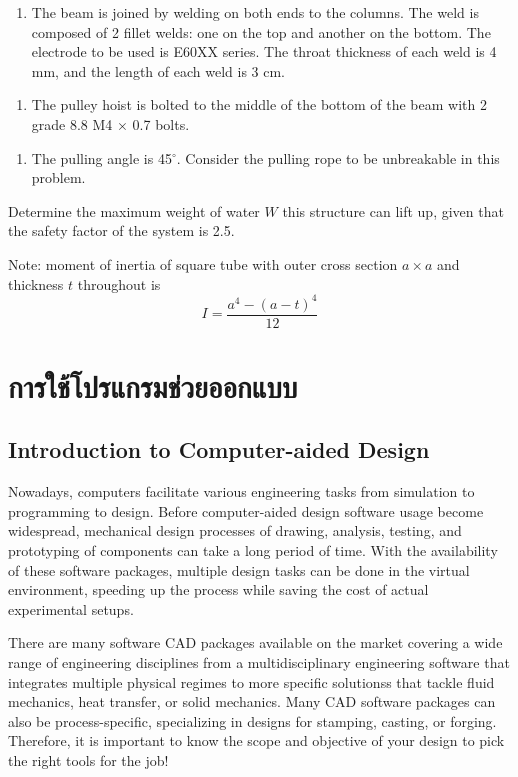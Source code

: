 \documentclass[a4paper,openany,12pt]{book}
\begin{document}
{{\hspace{1cm}
\begin{enumerate}
\item The beam is joined by welding on both ends to the columns. The weld
is composed of 2 fillet welds: one on the top and another on the
bottom. The electrode to be used is E60XX series. The throat
thickness of each weld is 4 mm, and the length of each weld is 3 cm.
\end{enumerate}


\begin{enumerate}
\item The pulley hoist is bolted to the middle of the bottom of the beam
with 2 grade 8.8 M4 \(\times\) 0.7 bolts.
\end{enumerate}


\begin{enumerate}
\item The pulling angle is 45\(^{\circ}\). Consider the pulling rope to be
unbreakable in this problem.
\end{enumerate}

Determine the maximum weight of water \(W\) this structure can lift up,
given that the safety factor of the system is 2.5.

Note: moment of inertia of square tube with outer cross section
\(a \times a\) and thickness \(t\) throughout is
$$I = \frac{a^4 - (a-t)^4}{12}$$

\part{การใช้โปรแกรมช่วยออกแบบ}
\label{sec:orgdc09abb}
\chapter{Introduction to Computer-aided Design}
\label{sec:orgafad926}
Nowadays, computers facilitate various engineering tasks from simulation
to programming to design. Before computer-aided design software usage
become widespread, mechanical design processes of drawing, analysis,
testing, and prototyping of components can take a long period of time.
With the availability of these software packages, multiple design tasks
can be done in the virtual environment, speeding up the process while
saving the cost of actual experimental setups.

There are many software CAD packages available on the market covering a
wide range of engineering disciplines from a multidisciplinary
engineering software that integrates multiple physical regimes to more
specific solutionss that tackle fluid mechanics, heat transfer, or solid
mechanics. Many CAD software packages can also be process-specific,
specializing in designs for stamping, casting, or forging. Therefore, it
is important to know the scope and objective of your design to pick the
right tools for the job!

}}
\end{document}
